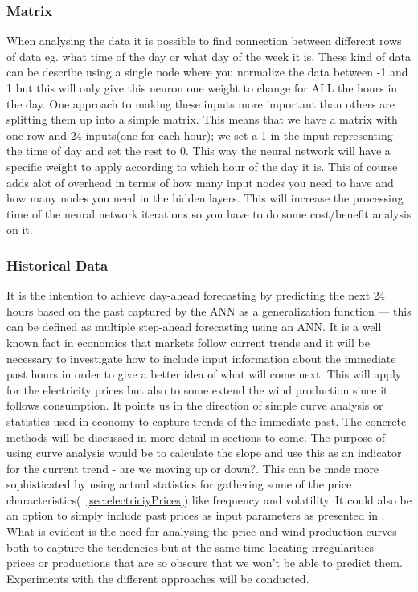 \subsubsection{Matrix}
When analysing the data it is possible to find connection between different rows of data eg. what time of the day or what day of the week it is. These kind of data can be describe using a single node where you normalize the data between -1 and 1 but this will only give this neuron one weight to change for ALL the hours in the day. One approach to making these inputs more important than others are splitting them up into a simple matrix. This means that we have a matrix with one row and 24 inputs(one for each hour); we set a 1 in the input representing the time of day and set the rest to 0. This way the neural network will have a specific weight to apply according to which hour of the day it is. This of course adds alot of overhead in terms of how many input nodes you need to have and how many nodes you need in the hidden layers. This will increase the processing time of the neural network iterations so you have to do some cost/benefit analysis on it. 

\subsubsection{Historical Data}
\label{sec:historicalData}
It is the intention to achieve day-ahead forecasting by predicting the next 24 hours based on the past captured by the ANN as a generalization function  --- this can be defined as multiple step-ahead forecasting using an ANN. 
It is a well known fact in economics that markets follow current trends  and it will be necessary to investigate how to include input information about the immediate past hours in order to give a better idea of what will come next. This will apply for the electricity prices but also to some extend the wind production since it follows consumption. It points us in the direction of simple curve analysis or statistics used in economy to capture trends of the immediate past. The concrete methods will be discussed in more detail in sections to come. The purpose of using curve analysis would be to calculate the slope and use this as an indicator for the current trend - are we moving up or down?. This can be made more sophisticated by using actual statistics for gathering some of the price characteristics(~\ref{sec:electriciyPrices}) like frequency and volatility. It could also be an option to simply include past prices as input parameters as presented in \cite{singhal2011electricity}.
What is evident is the need for analysing the price and wind production curves both to capture the tendencies but at the same time locating irregularities --- prices or productions that are so obscure that we won't be able to predict them. Experiments with the different approaches will be conducted.
